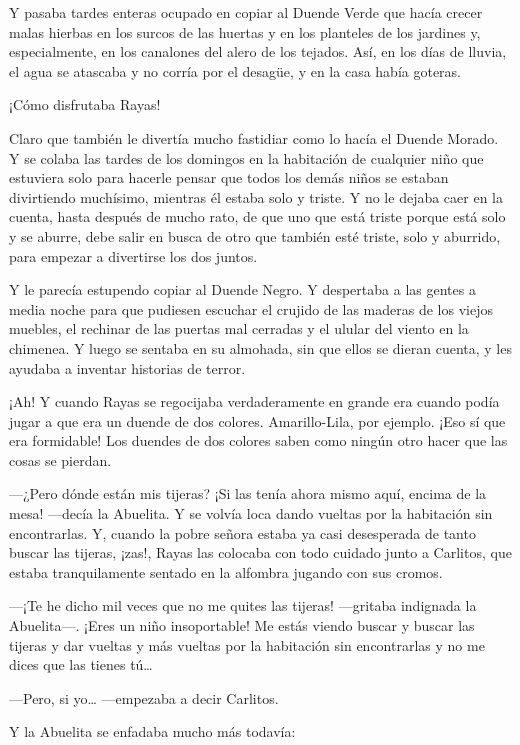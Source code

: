 \documentclass{barcodevapor3pags}
\begin{document}
Y pasaba tardes enteras ocupado en copiar al Duende Verde que hacía
crecer malas hierbas en los surcos de las huertas y en los planteles de
los jardines y, especialmente, en los canalones del alero de los
tejados. Así, en los días de lluvia, el agua se atascaba y no corría por
el desagüe, y en la casa había goteras.

¡Cómo disfrutaba Rayas!

Claro que también le divertía mucho fastidiar como lo hacía el Duende
Morado. Y se colaba las tardes de los domingos en la habitación de
cualquier niño que estuviera solo para hacerle pensar que todos los
demás niños se estaban divirtiendo muchísimo, mientras él estaba solo y
triste. Y no le dejaba caer en la cuenta, hasta después de mucho rato,
de que uno que está triste porque está solo y se aburre, debe salir en
busca de otro que también esté triste, solo y aburrido, para empezar a
divertirse los dos juntos.

Y le parecía estupendo copiar al Duende Negro. Y despertaba a las gentes
a media noche para que pudiesen escuchar el crujido de las maderas de
los viejos muebles, el rechinar de las puertas mal cerradas y el ulular
del viento en la chimenea. Y luego se sentaba en su almohada, sin que
ellos se dieran cuenta, y les ayudaba a inventar historias de terror.

¡Ah! Y cuando Rayas se regocijaba verdaderamente en grande era cuando
podía jugar a que era un duende de dos colores. Amarillo-Lila, por
ejemplo. ¡Eso sí que era formidable! Los duendes de dos colores saben
como ningún otro hacer que las cosas se pierdan.

---¿Pero dónde están mis tijeras? ¡Si las tenía ahora mismo aquí, encima
de la mesa! ---decía la Abuelita. Y se volvía loca dando vueltas por la
habitación sin encontrarlas. Y, cuando la pobre señora estaba ya casi
desesperada de tanto buscar las tijeras, ¡zas!, Rayas las colocaba con
todo cuidado junto a Carlitos, que estaba tranquilamente sentado en la
alfombra jugando con sus cromos.



---¡Te he dicho mil veces que no me quites las tijeras! ---gritaba
indignada la Abuelita---. ¡Eres un niño insoportable! Me estás viendo
buscar y buscar las tijeras y dar vueltas y más vueltas por la
habitación sin encontrarlas y no me dices que las tienes tú\ldots{}

---Pero, si yo\ldots{} ---empezaba a decir Carlitos.

Y la Abuelita se enfadaba mucho más todavía:
\end{document}
